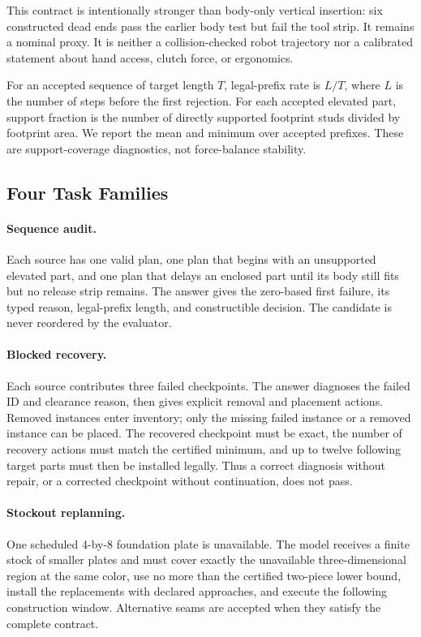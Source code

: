 This contract is intentionally stronger than body-only vertical insertion:
six constructed dead ends pass the earlier body test but fail the tool strip.
It remains a nominal proxy. It is neither a collision-checked robot trajectory
nor a calibrated statement about hand access, clutch force, or ergonomics.

For an accepted sequence of target length $T$, legal-prefix rate is
$L/T$, where $L$ is the number of steps before the first rejection.
For each accepted elevated part, support fraction is the number of directly
supported footprint studs divided by footprint area. We report the mean and
minimum over accepted prefixes. These are support-coverage diagnostics, not
force-balance stability.

\subsection{Four Task Families}
\paragraph{Sequence audit.}
Each source has one valid plan, one plan that begins with an unsupported
elevated part, and one plan that delays an enclosed part until its body still
fits but no release strip remains. The answer gives the zero-based first
failure, its typed reason, legal-prefix length, and constructible decision.
The candidate is never reordered by the evaluator.

\paragraph{Blocked recovery.}
Each source contributes three failed checkpoints. The answer diagnoses the
failed ID and clearance reason, then gives explicit removal and placement
actions. Removed instances enter inventory; only the missing failed instance
or a removed instance can be placed. The recovered checkpoint must be exact,
the number of recovery actions must match the certified minimum, and up to
twelve following target parts must then be installed legally. Thus a correct
diagnosis without repair, or a corrected checkpoint without continuation,
does not pass.

\paragraph{Stockout replanning.}
One scheduled 4-by-8 foundation plate is unavailable. The model receives a
finite stock of smaller plates and must cover exactly the unavailable
three-dimensional region at the same color, use no more than the certified
two-piece lower bound, install the replacements with declared approaches,
and execute the following construction window. Alternative seams are accepted
when they satisfy the complete contract.

